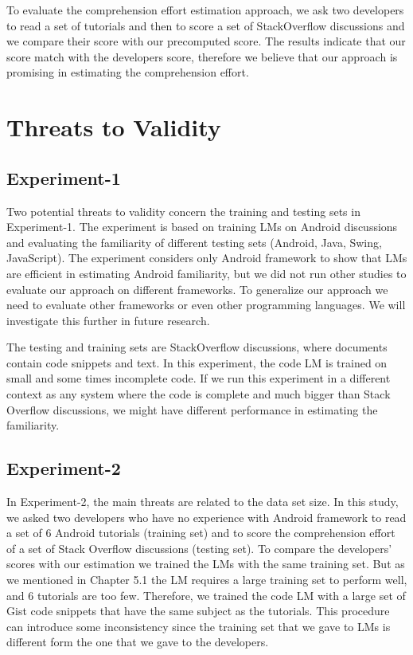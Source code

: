 \documentclass[12pt,mscthesis]{usiinfthesis}
\begin{document}
{To evaluate the comprehension effort estimation approach, we ask two developers to read a set of tutorials and then to score a set of StackOverflow discussions and we compare their score with our precomputed score. The results indicate that our score match with the developers score, therefore we believe that our approach is promising in estimating the comprehension effort.


\chapter{Threats to Validity}
\section{Experiment-1}

Two potential threats to validity concern the training and testing sets in Experiment-1.
The experiment is based on training LMs on Android discussions and evaluating the familiarity of different testing sets (Android, Java, Swing, JavaScript). The experiment considers only Android framework to show that LMs are efficient in estimating Android familiarity, but we did not run other studies to evaluate our approach on different frameworks. To generalize our approach we need to evaluate other frameworks or even other programming languages. We will investigate this further in future research.

The testing and training sets are StackOverflow discussions, where documents contain code snippets and text. In this experiment, the code LM is trained on small and some times incomplete code. If we run this experiment in a different context as any system where the code is complete and much bigger than Stack Overflow discussions, we might have different performance in estimating the familiarity.

\section{Experiment-2}
In Experiment-2, the main threats are related to the data set size. In this study, we asked two developers who have no experience with Android framework to read a set of 6 Android tutorials (training set) and to score the comprehension effort of a set of Stack Overflow discussions (testing set). To compare the developers' scores with our estimation we trained the LMs with the same training set. But as we mentioned in Chapter 5.1 the LM requires a large training set to perform well, and 6 tutorials are too few. Therefore, we trained the code LM  with a large set of Gist code snippets that have the same subject as the tutorials. This procedure can introduce some inconsistency since the training set that we gave to LMs is different form the one that we gave to the developers.

}
\end{document}
